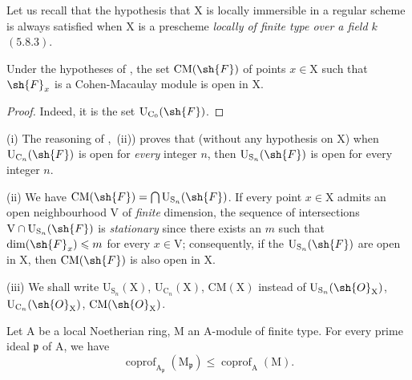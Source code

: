 Let us recall that the hypothesis that $\mathrm{X}$ is locally immersible in a regular scheme
is always satisfied when $\mathrm{X}$ is a prescheme \emph{locally of finite type over a field $k$}
$(5.8.3)$.

\begin{corollary}[6.11.3]
\label{IV.6.11.3}
Under the hypotheses of , the set $\mathrm{CM}(\sh{F})$ of points
$x\in\mathrm{X}$ such that $\sh{F}_x$ is a Cohen-Macaulay module is open in $\mathrm{X}$.
\end{corollary}

\begin{proof}
Indeed, it is the set $\mathrm{U}_{\mathrm{C}_0}(\sh{F})$.
\end{proof}

\begin{remarks}[6.11.4]
\label{IV.6.11.4}
(i) The reasoning of ,~(ii)) proves that (without any
hypothesis on $\mathrm{X}$) when $\mathrm{U}_{\mathrm{C}_n}(\sh{F})$ is open for \emph{every} integer $n$, then $\mathrm{U}_{\mathrm{S}_n}(\sh{F})$ is open
for every integer $n$.

(ii) We have $\mathrm{CM}(\sh{F})=\bigcap\mathrm{U}_{\mathrm{S}_n}(\sh{F})$. If every point $x\in\mathrm{X}$ admits an open neighbourhood $\mathrm{V}$
of \emph{finite} dimension, the sequence of intersections $\mathrm{V}\cap\mathrm{U}_{\mathrm{S}_n}(\sh{F})$ is \emph{stationary} since
there exists an $m$ such that $\dim(\sh{F}_x)\leqslant m$ for every $x\in\mathrm{V}$; consequently, if the $\mathrm{U}_{\mathrm{S}_n}(\sh{F})$ are open
in $\mathrm{X}$, then $\mathrm{CM}(\sh{F})$ is also open in $\mathrm{X}$.

(iii) We shall write $\mathrm{U}_{\mathrm{S}_n}(\mathrm{X})$, $\mathrm{U}_{\mathrm{C}_n}(\mathrm{X})$, $\mathrm{CM}(\mathrm{X})$ instead of $\mathrm{U}_{\mathrm{S}_n}(\sh{O}_\mathrm{X})$, $\mathrm{U}_{\mathrm{C}_n}(\sh{O}_\mathrm{X})$, $\mathrm{CM}(\sh{O}_\mathrm{X})$.
\end{remarks}

\begin{proposition}[6.11.5]
\label{IV.6.11.5}
Let $\mathrm{A}$ be a local Noetherian ring, $\mathrm{M}$ an $\mathrm{A}$-module of finite
type. For every prime ideal $\mathfrak{p}$ of $\mathrm{A}$, we have
\begin{equation}
\tag{6.11.5.1}
\label{IV.6.11.5.1}
  \operatorname{coprof}_{\mathrm{A}_\mathfrak{p}}(\mathrm{M}_\mathfrak{p})\leqslant\operatorname{coprof}_\mathrm{A}(\mathrm{M}).
\end{equation}
\end{proposition}

